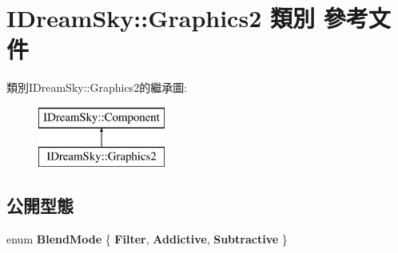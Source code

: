 \hypertarget{class_i_dream_sky_1_1_graphics2}{}\section{I\+Dream\+Sky\+:\+:Graphics2 類別 參考文件}
\label{class_i_dream_sky_1_1_graphics2}
類別\+I\+Dream\+Sky\+:\+:Graphics2的繼承圖\+:\begin{figure}[H]
\begin{center}
\leavevmode
\includegraphics[height=2.000000cm]{class_i_dream_sky_1_1_graphics2}
\end{center}
\end{figure}
\subsection*{公開型態}
\begin{DoxyCompactItemize}
\item 
enum {\bfseries Blend\+Mode} \{ {\bfseries Filter}, 
{\bfseries Addictive}, 
{\bfseries Subtractive}
 \}\hypertarget{class_i_dream_sky_1_1_graphics2_ac8b2961de597b2db6dd5189f15d9822b}{}\label{class_i_dream_sky_1_1_graphics2_ac8b2961de597b2db6dd5189f15d9822b}

\end{DoxyCompactItemize}
